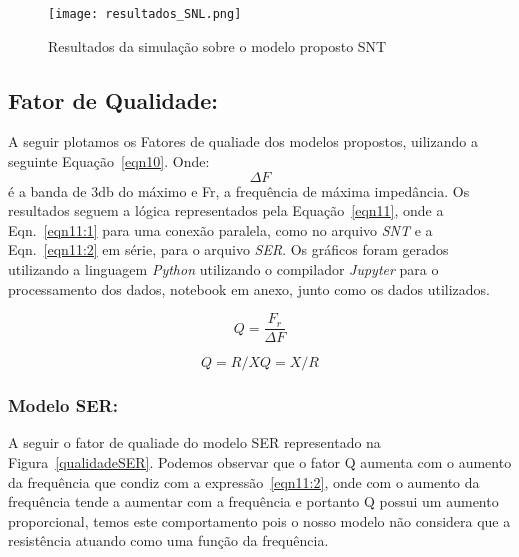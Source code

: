 \documentclass[a4paper,12pt]{proc}
\begin{document}
\begin{figure}[htbp]
    \centering
    \texttt{[image: resultados\_SNL.png]}
    \caption{Resultados da simulação sobre o modelo proposto SNT}
    \label{resulsnl}
\end{figure}

\subsection{Fator de Qualidade:}

A seguir plotamos os Fatores de qualiade dos modelos propostos, uilizando a seguinte Equação~\ref{eqn10}. Onde: \[\varDelta F\] é a banda de 3db do máximo e Fr, a frequência de máxima impedância. Os resultados seguem a lógica representados pela Equação~\ref{eqn11}, onde a Eqn.~\ref{eqn11:1} para uma conexão paralela, como no arquivo \textit{SNT} e a Eqn.~\ref{eqn11:2} em série, para o arquivo \textit{SER}. Os gráficos foram gerados utilizando a linguagem \textit{Python} utilizando o compilador \textit{Jupyter} para o processamento dos dados, notebook em anexo, junto como os dados utilizados.  

\begin{equation}
    Q = \frac{F_{r}}{\varDelta F}
    \label{eqn10}
\end{equation}

\begin{subequations}

    \begin{equation}
    Q = R/X 
    \label{eqn11:1}
    \end{equation}

    \begin{equation}
    Q = X/R
    \label{eqn11:2}
    \end{equation}

    \label{eqn11}
\end{subequations}


\subsubsection{Modelo SER:}

A seguir o fator de qualiade do modelo SER representado na Figura~\ref{qualidadeSER}. Podemos observar que o fator Q aumenta com o aumento da frequência que condiz com a expressão~\ref{eqn11:2}, onde com o aumento da frequência tende a aumentar com a frequência e portanto Q possui um aumento proporcional, temos este comportamento pois o nosso modelo não considera que a resistência atuando como uma função da frequência.
\end{document}
